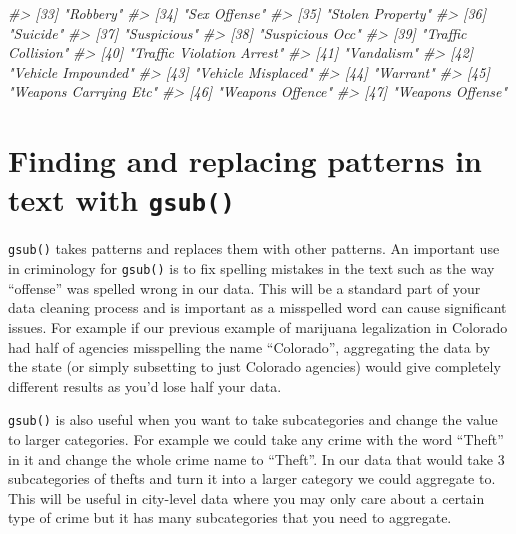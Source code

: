 \documentclass[
  12pt,
]{book}
\newenvironment{Shaded}{\begin{snugshade}}{\end{snugshade}}
\newcommand{\CommentTok}[1]{\textcolor[rgb]{0.37,0.37,0.37}{\textit{#1}}}
\begin{document}
\begin{Shaded}
\begin{Highlighting}[]
\CommentTok{\#> [33] "Robbery"                                   }
\CommentTok{\#> [34] "Sex Offense"                               }
\CommentTok{\#> [35] "Stolen Property"                           }
\CommentTok{\#> [36] "Suicide"                                   }
\CommentTok{\#> [37] "Suspicious"                                }
\CommentTok{\#> [38] "Suspicious Occ"                            }
\CommentTok{\#> [39] "Traffic Collision"                         }
\CommentTok{\#> [40] "Traffic Violation Arrest"                  }
\CommentTok{\#> [41] "Vandalism"                                 }
\CommentTok{\#> [42] "Vehicle Impounded"                         }
\CommentTok{\#> [43] "Vehicle Misplaced"                         }
\CommentTok{\#> [44] "Warrant"                                   }
\CommentTok{\#> [45] "Weapons Carrying Etc"                      }
\CommentTok{\#> [46] "Weapons Offence"                           }
\CommentTok{\#> [47] "Weapons Offense"}
\end{Highlighting}
\end{Shaded}

\hypertarget{finding-and-replacing-patterns-in-text-with-gsub}{%
\section{\texorpdfstring{Finding and replacing patterns in text with \texttt{gsub()}}{Finding and replacing patterns in text with gsub()}}\label{finding-and-replacing-patterns-in-text-with-gsub}}

\texttt{gsub()} takes patterns and replaces them with other patterns. An important use in criminology for \texttt{gsub()} is to fix spelling mistakes in the text such as the way ``offense'' was spelled wrong in our data. This will be a standard part of your data cleaning process and is important as a misspelled word can cause significant issues. For example if our previous example of marijuana legalization in Colorado had half of agencies misspelling the name ``Colorado'', aggregating the data by the state (or simply subsetting to just Colorado agencies) would give completely different results as you'd lose half your data.

\texttt{gsub()} is also useful when you want to take subcategories and change the value to larger categories. For example we could take any crime with the word ``Theft'' in it and change the whole crime name to ``Theft''. In our data that would take 3 subcategories of thefts and turn it into a larger category we could aggregate to. This will be useful in city-level data where you may only care about a certain type of crime but it has many subcategories that you need to aggregate.
\end{document}
